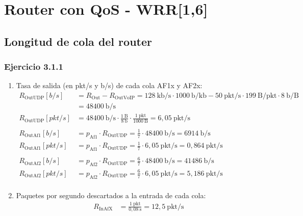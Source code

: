 \chapter{Router con QoS - WRR[1,6]}
\label{chap:conqoswrr16}
\renewcommand{\theenumi}{\alph{enumi}}

\section{Longitud de cola del router}

\subsection{Ejercicio 3.1.1}
\begin{enumerate}
    \item Tasa de salida (en pkt/s y b/s) de cada cola AF1x y AF2x:
    \[
        \begin{aligned}
            R_{\text{OutUDP}}[b/s] &= R_{\text{Out}} - R_{\text{OutVoIP}} = 128~\text{kb/s} \cdot 1000~\text{b/kb} - 50~\text{pkt/s} \cdot 199~\text{B/pkt} \cdot 8~\text{b/B} \\
                              &= 48400~\text{b/s} \\
            R_{\text{OutUDP}}[pkt/s] &= 48400~\text{b/s} \cdot \frac{1~\text{B}}{8~\text{b}} \cdot \frac{1~\text{pkt}}{1000~\text{B}} = 6,05~\text{pkt/s} \\ \\
            R_{\text{OutAf1}}[b/s] &= p_{\text{Af1}} \cdot R_{\text{OutUDP}} = \frac{1}{7} \cdot 48400~\text{b/s} = 6914~\text{b/s} \\
            R_{\text{OutAf1}}[pkt/s] &= p_{\text{Af1}} \cdot R_{\text{OutUDP}} = \frac{1}{7} \cdot 6,05~\text{pkt/s} = 0,864~\text{pkt/s} \\ \\
            R_{\text{OutAf2}}[b/s] &= p_{\text{Af2}} \cdot R_{\text{OutUDP}} = \frac{6}{7} \cdot 48400~\text{b/s} = 41486~\text{b/s} \\
            R_{\text{OutAf2}}[pkt/s] &= p_{\text{Af2}} \cdot R_{\text{OutUDP}} = \frac{6}{7} \cdot 6,05~\text{pkt/s} = 5,186~\text{pkt/s} \\
        \end{aligned}
    \]
    \item Paquetes por segundo descartados a la entrada de cada cola:
    \[
        \begin{aligned}
            R_{\text{InAfX}} &= \frac{1~\text{pkt}}{0,08~\text{s}} = 12,5~\text{pkt/s} \\ \\

\end{aligned}\]
\end{enumerate}
